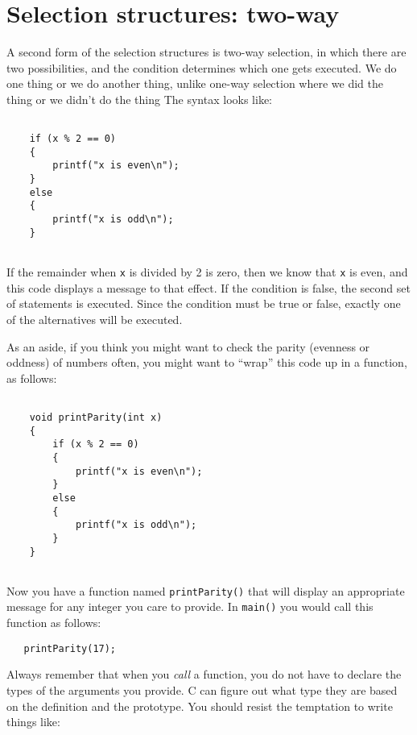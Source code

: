 \section {Selection structures: two-way}
\label{alternative}

A second form of the selection structures is two-way selection, 
in which there are two possibilities, and the condition determines
which one gets executed.  We do one thing or we do another thing, 
unlike one-way selection where we did the thing or we didn't do the thing
 The syntax looks like:

\begin{verbatim}

    if (x % 2 == 0)
    {
        printf("x is even\n");
    } 
    else 
    {
        printf("x is odd\n");
    }
  
\end{verbatim}
%
If the remainder when {\tt x} is divided by 2 is zero, then
we know that {\tt x} is even, and this code displays a message
to that effect.  If the condition is false, the second
set of statements is executed.  Since the condition must
be true or false, exactly one of the alternatives will be
executed.

As an aside, if you think you might want to check the parity
(evenness or oddness) of numbers often, you might want to
``wrap'' this code up in a function, as follows:

\begin{verbatim}

    void printParity(int x) 
    {
        if (x % 2 == 0) 
        {
            printf("x is even\n");
        } 
        else 
        {
            printf("x is odd\n");
        }
    }
  
\end{verbatim}
%
Now you have a function named {\tt printParity()} that will display
an appropriate message for any integer you care to provide.
In {\tt main()} you would call this function as follows:

\begin{verbatim}
   printParity(17);
\end{verbatim}
%
Always remember that when you {\em call} a function, you do
not have to declare the types of the arguments you provide.
C can figure out what type they are based on the definition and the prototype.
You should resist the temptation to write things like:

